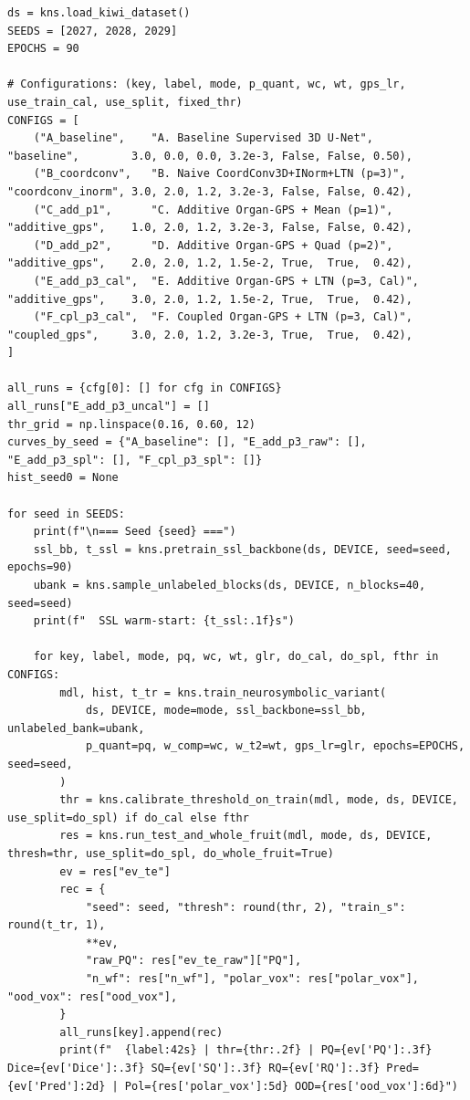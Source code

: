 \documentclass[10pt,a4paper]{article}
\renewcommand{\_}{\origunderscore\allowbreak}
\begin{document}
\begin{codebox}
\begin{lstlisting}[style=pybmed]
ds = kns.load_kiwi_dataset()
SEEDS = [2027, 2028, 2029]
EPOCHS = 90

# Configurations: (key, label, mode, p_quant, wc, wt, gps_lr, use_train_cal, use_split, fixed_thr)
CONFIGS = [
    ("A_baseline",    "A. Baseline Supervised 3D U-Net",        "baseline",        3.0, 0.0, 0.0, 3.2e-3, False, False, 0.50),
    ("B_coordconv",   "B. Naive CoordConv3D+INorm+LTN (p=3)",   "coordconv_inorm", 3.0, 2.0, 1.2, 3.2e-3, False, False, 0.42),
    ("C_add_p1",      "C. Additive Organ-GPS + Mean (p=1)",     "additive_gps",    1.0, 2.0, 1.2, 3.2e-3, False, False, 0.42),
    ("D_add_p2",      "D. Additive Organ-GPS + Quad (p=2)",     "additive_gps",    2.0, 2.0, 1.2, 1.5e-2, True,  True,  0.42),
    ("E_add_p3_cal",  "E. Additive Organ-GPS + LTN (p=3, Cal)", "additive_gps",    3.0, 2.0, 1.2, 1.5e-2, True,  True,  0.42),
    ("F_cpl_p3_cal",  "F. Coupled Organ-GPS + LTN (p=3, Cal)",  "coupled_gps",     3.0, 2.0, 1.2, 3.2e-3, True,  True,  0.42),
]

all_runs = {cfg[0]: [] for cfg in CONFIGS}
all_runs["E_add_p3_uncal"] = []
thr_grid = np.linspace(0.16, 0.60, 12)
curves_by_seed = {"A_baseline": [], "E_add_p3_raw": [], "E_add_p3_spl": [], "F_cpl_p3_spl": []}
hist_seed0 = None

for seed in SEEDS:
    print(f"\n=== Seed {seed} ===")
    ssl_bb, t_ssl = kns.pretrain_ssl_backbone(ds, DEVICE, seed=seed, epochs=90)
    ubank = kns.sample_unlabeled_blocks(ds, DEVICE, n_blocks=40, seed=seed)
    print(f"  SSL warm-start: {t_ssl:.1f}s")

    for key, label, mode, pq, wc, wt, glr, do_cal, do_spl, fthr in CONFIGS:
        mdl, hist, t_tr = kns.train_neurosymbolic_variant(
            ds, DEVICE, mode=mode, ssl_backbone=ssl_bb, unlabeled_bank=ubank,
            p_quant=pq, w_comp=wc, w_t2=wt, gps_lr=glr, epochs=EPOCHS, seed=seed,
        )
        thr = kns.calibrate_threshold_on_train(mdl, mode, ds, DEVICE, use_split=do_spl) if do_cal else fthr
        res = kns.run_test_and_whole_fruit(mdl, mode, ds, DEVICE, thresh=thr, use_split=do_spl, do_whole_fruit=True)
        ev = res["ev_te"]
        rec = {
            "seed": seed, "thresh": round(thr, 2), "train_s": round(t_tr, 1),
            **ev,
            "raw_PQ": res["ev_te_raw"]["PQ"],
            "n_wf": res["n_wf"], "polar_vox": res["polar_vox"], "ood_vox": res["ood_vox"],
        }
        all_runs[key].append(rec)
        print(f"  {label:42s} | thr={thr:.2f} | PQ={ev['PQ']:.3f} Dice={ev['Dice']:.3f} SQ={ev['SQ']:.3f} RQ={ev['RQ']:.3f} Pred={ev['Pred']:2d} | Pol={res['polar_vox']:5d} OOD={res['ood_vox']:6d}")


\end{lstlisting}
\end{codebox}
\end{document}

